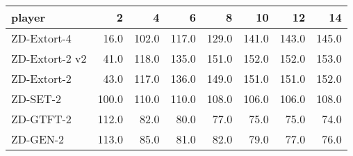\begin{tabular}{lrrrrrrr}
\toprule
         player &      2 &      4 &      6 &      8 &     10 &     12 &     14 \\
\midrule
    ZD-Extort-4 &   16.0 &  102.0 &  117.0 &  129.0 &  141.0 &  143.0 &  145.0 \\
 ZD-Extort-2 v2 &   41.0 &  118.0 &  135.0 &  151.0 &  152.0 &  152.0 &  153.0 \\
    ZD-Extort-2 &   43.0 &  117.0 &  136.0 &  149.0 &  151.0 &  151.0 &  152.0 \\
       ZD-SET-2 &  100.0 &  110.0 &  110.0 &  108.0 &  106.0 &  106.0 &  108.0 \\
      ZD-GTFT-2 &  112.0 &   82.0 &   80.0 &   77.0 &   75.0 &   75.0 &   74.0 \\
       ZD-GEN-2 &  113.0 &   85.0 &   81.0 &   82.0 &   79.0 &   77.0 &   76.0 \\
\bottomrule
\end{tabular}
